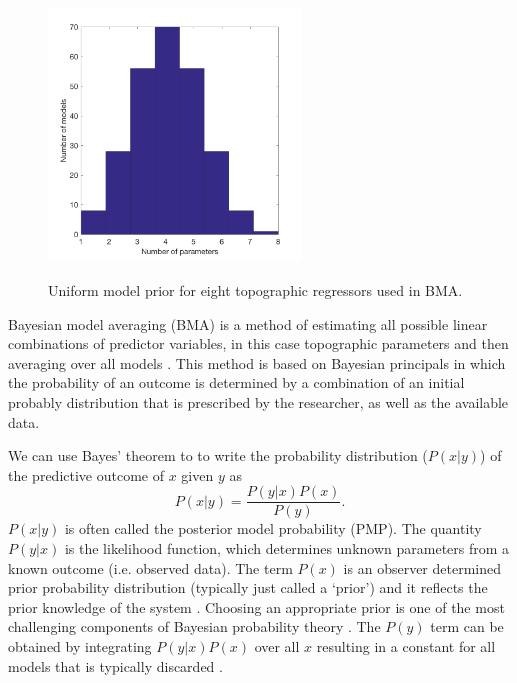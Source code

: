 \documentclass{sfuthesis}
\begin{document}
\begin{figure}
	\centering
	\includegraphics[width = 0.6\textwidth]{DistributionOfNumParams_topoRegress.png}\\
	\caption{Uniform model prior for eight topographic regressors used in BMA.}
	\label{fig:uni_model_prior}
\end{figure}

Bayesian model averaging (BMA) is a method of estimating all possible linear combinations of predictor variables, in this case topographic parameters and then averaging over all models \citep[e.g.][]{Raftery1997, Wasserman2000, Raftery2005}.  This method is based on Bayesian principals in which the probability of an outcome is determined by a combination of an initial probably distribution that is prescribed by the researcher, as well as the available data. 

We can use Bayes' theorem to to write the probability distribution ($P(x|y)$) of the predictive outcome of $x$ given $y$ as
\begin{equation}
P(x|y) = \frac{P(y|x)P(x)}{P(y)}.
\end{equation}
$P(x|y)$ is often called the posterior model probability (PMP). The quantity $P(y|x)$ is the likelihood function, which determines unknown parameters from a known outcome (i.e. observed data). The term $P(x)$ is an observer determined prior probability distribution (typically just called a `prior') and it reflects the prior knowledge of the system \citep{Raftery1997}. Choosing an appropriate prior is one of the most challenging components of Bayesian probability theory \citep{Wasserman2000}. The $P(y)$ term can be obtained by integrating $P(y|x)P(x)$ over all $x$ resulting in a constant for all models that is typically discarded \citep{Wasserman2000}. 
\end{document}
